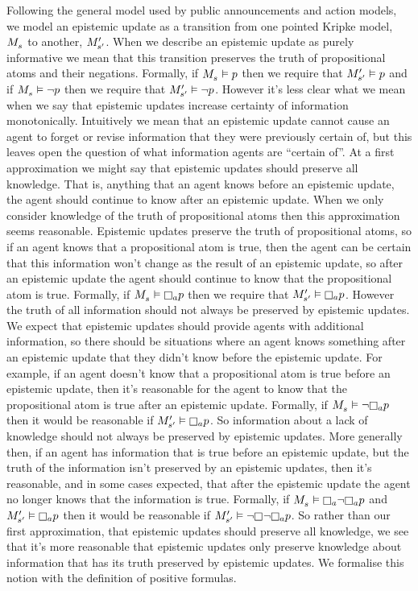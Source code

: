 Following the general model used by public announcements and action models, we model an epistemic update as a transition from one pointed Kripke model, $\kPModel{\kStateS}$ to another, ${M^{\prime}_{{s}^{\prime}}}$.
When we describe an epistemic update as purely informative we mean that this transition preserves the truth of propositional atoms and their negations.
Formally, if $\kPModel{\kStateS} \entails \atomP$ then we require that ${M^{\prime}_{{s}^{\prime}}} \vDash p$ and if $\kPModel{\kStateS} \entails \lnot \atomP$ then we require that ${M^{\prime}_{{s}^{\prime}}} \vDash \lnot p$.
However it's less clear what we mean when we say that epistemic updates increase certainty of information monotonically.
Intuitively we mean that an epistemic update cannot cause an agent to forget or revise information that they were previously certain of, but this leaves open the question of what information agents are ``certain of''.
At a first approximation we might say that epistemic updates should preserve all knowledge.
That is, anything that an agent knows before an epistemic update, the agent should continue to know after an epistemic update.
When we only consider knowledge of the truth of propositional atoms then this approximation seems reasonable.
Epistemic updates preserve the truth of propositional atoms, so if an agent knows that a propositional atom is true, then the agent can be certain that this information won't change as the result of an epistemic update, so after an epistemic update the agent should continue to know that the propositional atom is true.
Formally, if $\kPModel{\kStateS} \entails \knowsA \atomP$ then we require that $\kPModelP{\kStateSP} \entails \knowsA \atomP$.
However the truth of all information should not always be preserved by epistemic updates.
We expect that epistemic updates should provide agents with additional information, so there should be situations where an agent knows something after an epistemic update that they didn't know before the epistemic update.
For example, if an agent doesn't know that a propositional atom is true before an epistemic update, then it's reasonable for the agent to know that the propositional atom is true after an epistemic update.
Formally, if $\kPModel{\kStateS} \entails \lnot \knowsA \atomP$ then it would be reasonable if $\kPModelP{\kStateSP} \entails \knowsA \atomP$.
So information about a lack of knowledge should not always be preserved by epistemic updates.
More generally then, if an agent has information that is true before an epistemic update, but the truth of the information isn't preserved by an epistemic updates, then it's reasonable, and in some cases expected, that after the epistemic update the agent no longer knows that the information is true.
Formally, if $\kPModel{\kStateS} \entails \knowsA \lnot \knowsA \atomP$ and $\kPModelP{\kStateSP} \entails \knowsA \atomP$ then it would be reasonable if $\kPModelP{\kStateSP} \entails \lnot \knows \lnot \knowsA \atomP$.
So rather than our first approximation, that epistemic updates should preserve all knowledge, we see that it's more reasonable that epistemic updates only preserve knowledge about information that has its truth preserved by epistemic updates.
We formalise this notion with the definition of positive formulas.

